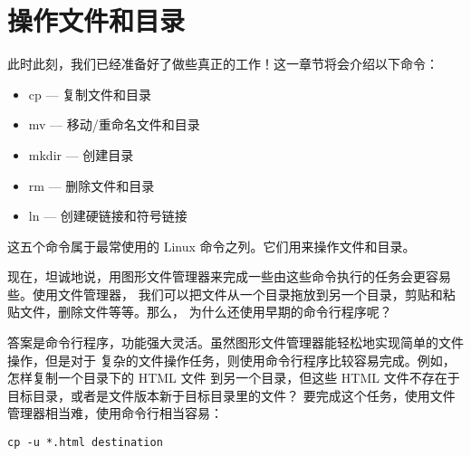 \renewcommand\chapterillustration{cherry-tomatos}
\chapter{操作文件和目录}

此时此刻，我们已经准备好了做些真正的工作！这一章节将会介绍以下命令：

\begin{itemize}
	\item cp — 复制文件和目录
	\item mv — 移动/重命名文件和目录
	\item mkdir — 创建目录
	\item rm — 删除文件和目录
	\item ln — 创建硬链接和符号链接
\end{itemize}

\par 这五个命令属于最常使用的 Linux 命令之列。它们用来操作文件和目录。

\par 现在，坦诚地说，用图形文件管理器来完成一些由这些命令执行的任务会更容易些。使用文件管理器， 我们可以把文件从一个目录拖放到另一个目录，剪贴和粘贴文件，删除文件等等。那么， 为什么还使用早期的命令行程序呢？

\par 答案是命令行程序，功能强大灵活。虽然图形文件管理器能轻松地实现简单的文件操作，但是对于 复杂的文件操作任务，则使用命令行程序比较容易完成。例如，怎样复制一个目录下的 HTML 文件 到另一个目录，但这些 HTML 文件不存在于目标目录，或者是文件版本新于目标目录里的文件？ 要完成这个任务，使用文件管理器相当难，使用命令行相当容易：

\begin{lstlisting}
cp -u *.html destination 
\end{lstlisting}








% 

% 

% 

% 
